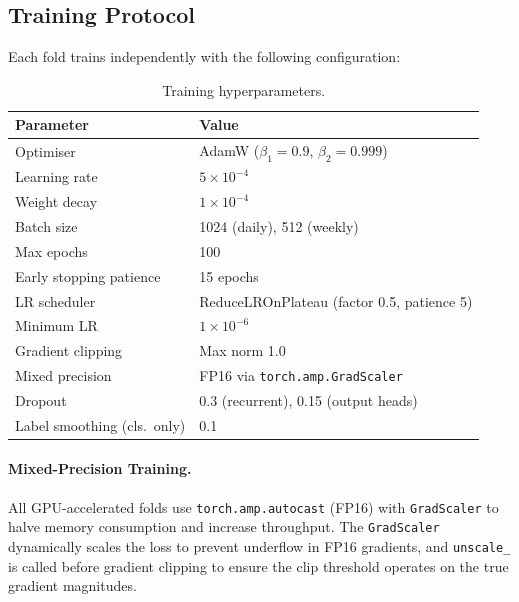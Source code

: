 \subsection{Training Protocol}
\label{sec:training-protocol}

Each fold trains independently with the following configuration:

\begin{table}[htbp]
\centering
\caption{Training hyperparameters.}
\label{tab:training-config}
\begin{tabular}{@{}ll@{}}
\toprule
\textbf{Parameter}           & \textbf{Value} \\
\midrule
Optimiser                    & AdamW ($\beta_1{=}0.9$, $\beta_2{=}0.999$) \\
Learning rate                & $5 \times 10^{-4}$ \\
Weight decay                 & $1 \times 10^{-4}$ \\
Batch size                   & 1024 (daily), 512 (weekly) \\
Max epochs                   & 100 \\
Early stopping patience      & 15 epochs \\
LR scheduler                 & ReduceLROnPlateau (factor 0.5, patience 5) \\
Minimum LR                   & $1 \times 10^{-6}$ \\
Gradient clipping             & Max norm 1.0 \\
Mixed precision              & FP16 via \texttt{torch.amp.GradScaler} \\
Dropout                      & 0.3 (recurrent), 0.15 (output heads) \\
Label smoothing (cls.\ only) & 0.1 \\
\bottomrule
\end{tabular}
\end{table}

\paragraph{Mixed-Precision Training.}
All GPU-accelerated folds use \texttt{torch.amp.autocast} (FP16) with
\texttt{GradScaler} to halve memory consumption and increase throughput.  The
\texttt{GradScaler} dynamically scales the loss to prevent underflow in FP16
gradients, and \texttt{unscale\_} is called before gradient clipping to ensure
the clip threshold operates on the true gradient magnitudes.

